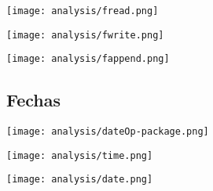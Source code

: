 \begin{multicols}{2}
\begin{center}
\texttt{[image: analysis/fread.png]} 
\end{center}
\columnbreak
\begin{center}
\texttt{[image: analysis/fwrite.png]} 
\end{center}
\end{multicols}

\begin{center}
\texttt{[image: analysis/fappend.png]} 
\end{center}
 \pagebreak

\subsection {Fechas}
\begin{center}
\texttt{[image: analysis/dateOp-package.png]} 
\end{center}

\begin{multicols}{2}
\begin{center}
\texttt{[image: analysis/time.png]} 
\end{center}
\columnbreak
\begin{center}
\texttt{[image: analysis/date.png]} 
\end{center}
\end{multicols}


